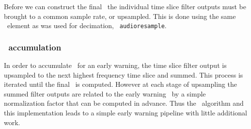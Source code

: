 Before we can construct the final \SNR\, the individual time slice filter
outputs must be brought to a common sample rate, or upsampled.  This is done
using the same \gstreamer\ element as was used for decimation, {\tt
audioresample}.  

\subsubsection{\SNR\ accumulation}

In order to accumulate \SNR\ for an early warning, the time slice filter
output is upsampled to the next highest frequency time slice and summed. This
process is iterated until the final \SNR\ is computed.  However at each stage
of upsampling the summed filter outputs are related to the early warning \SNR\
by a simple normalization factor that can be computed in advance. Thus the
\lloid\ algorithm and this implementation leads to a simple early warning
pipeline with little additional work.


